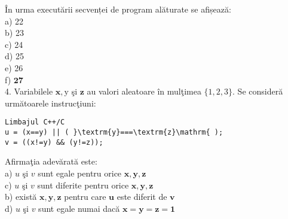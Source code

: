 În urma executării secvenței de program alăturate se afișează:\\
a) 22\\
b) 23\\
c) 24\\
d) 25\\
e) 26\\
f) $\mathbf{2 7}$\\
4. Variabilele $\mathbf{x}, \mathrm{y}$ şi $\mathbf{z}$ au valori aleatoare în mulţimea $\{1,2,3\}$. Se consideră următoarele instrucţiuni:

\begin{verbatim}
Limbajul C++/C
u = (x==y) || ( }\textrm{y}===\textrm{z}\mathrm{ );
v = ((x!=y) && (y!=z));
\end{verbatim}

Afirmaţia adevărată este:\\
a) $u$ şi $v$ sunt egale pentru orice $\mathbf{x}, \mathbf{y}, \mathbf{z}$\\
c) $u$ şi $v$ sunt diferite pentru orice $\mathbf{x}, \mathbf{y}, \mathbf{z}$\\
b) există $\mathbf{x}, \mathbf{y}, \mathbf{z}$ pentru care $\mathbf{u}$ este diferit de $\mathbf{v}$\\
d) $u$ şi $v$ sunt egale numai dacă $\mathbf{x}=\mathbf{y}=\mathbf{z = 1}$

